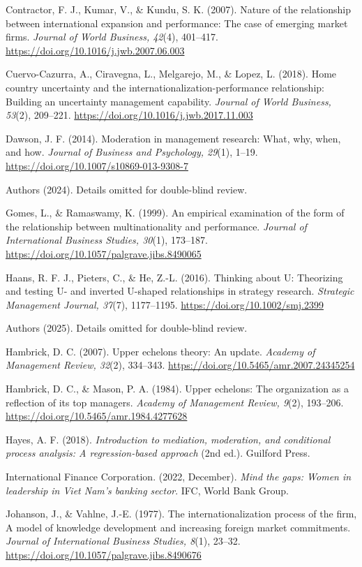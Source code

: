 \documentclass[
  12pt,a4paper]{article}
\begin{document}
Contractor, F. J., Kumar, V., \& Kundu, S. K. (2007). Nature of the
relationship between international expansion and performance: The case
of emerging market firms. \emph{Journal of World Business, 42}(4),
401--417. \url{https://doi.org/10.1016/j.jwb.2007.06.003}

Cuervo-Cazurra, A., Ciravegna, L., Melgarejo, M., \& Lopez, L. (2018).
Home country uncertainty and the internationalization-performance
relationship: Building an uncertainty management capability.
\emph{Journal of World Business, 53}(2), 209--221.
\url{https://doi.org/10.1016/j.jwb.2017.11.003}

Dawson, J. F. (2014). Moderation in management research: What, why,
when, and how. \emph{Journal of Business and Psychology, 29}(1), 1--19.
\url{https://doi.org/10.1007/s10869-013-9308-7}

Authors (2024). Details omitted for double-blind review.

Gomes, L., \& Ramaswamy, K. (1999). An empirical examination of the form
of the relationship between multinationality and performance.
\emph{Journal of International Business Studies, 30}(1), 173--187.
\url{https://doi.org/10.1057/palgrave.jibs.8490065}

Haans, R. F. J., Pieters, C., \& He, Z.-L. (2016). Thinking about U:
Theorizing and testing U- and inverted U-shaped relationships in
strategy research. \emph{Strategic Management Journal, 37}(7),
1177--1195. \url{https://doi.org/10.1002/smj.2399}

Authors (2025). Details omitted for double-blind review.

Hambrick, D. C. (2007). Upper echelons theory: An update. \emph{Academy
of Management Review, 32}(2), 334--343.
\url{https://doi.org/10.5465/amr.2007.24345254}

Hambrick, D. C., \& Mason, P. A. (1984). Upper echelons: The
organization as a reflection of its top managers. \emph{Academy of
Management Review, 9}(2), 193--206.
\url{https://doi.org/10.5465/amr.1984.4277628}

Hayes, A. F. (2018). \emph{Introduction to mediation, moderation, and
conditional process analysis: A regression-based approach} (2nd ed.).
Guilford Press.

International Finance Corporation. (2022, December). \emph{Mind the
gaps: Women in leadership in Viet Nam's banking sector}. IFC, World Bank
Group.

Johanson, J., \& Vahlne, J.-E. (1977). The internationalization process
of the firm, A model of knowledge development and increasing foreign
market commitments. \emph{Journal of International Business Studies,
8}(1), 23--32. \url{https://doi.org/10.1057/palgrave.jibs.8490676}
\end{document}
